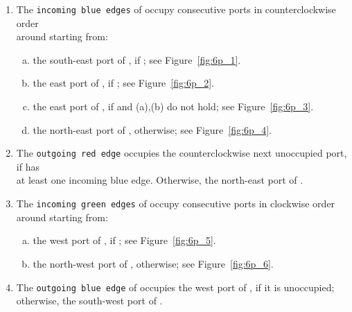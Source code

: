 \documentclass[a4paper,twoside,11pt]{article}
\begin{document}
\begin{algorithm}[t!]
\DontPrintSemicolon
{}

\BlankLine
\begin{enumerate}[{R}1:] 
\item \label{c1} The \texttt{incoming blue edges} of  occupy
consecutive ports in counterclockwise order\\around  starting
from:

\begin{enumerate}[a.]
\item \label{c1a} the south-east port of , if ; 
see Figure~\ref{fig:6p_1}.
\item \label{c1b} the east port of , if ; see Figure~\ref{fig:6p_2}.
\item \label{c1c} the east port of , if  and
(a),(b) do not hold; see Figure~\ref{fig:6p_3}. 
\item \label{c1d} the north-east port of , otherwise;
see Figure~\ref{fig:6p_4}.
\end{enumerate} 

\medskip

\item \label{c2} The \texttt{outgoing red edge} occupies the
counterclockwise next unoccupied port, if  has\\at least
one incoming blue edge. Otherwise, the north-east port of .

\medskip

\item The \label{c3} \texttt{incoming green edges} of  occupy
consecutive ports in clockwise order around  starting from:

\begin{enumerate}[a.]
\item \label{c3a} the west port of , if ; 
see Figure~\ref{fig:6p_5}.
\item \label{c3b} the north-west port of , otherwise; 
see Figure~\ref{fig:6p_6}.
\end{enumerate} 

\medskip

\item \label{c4} The \texttt{outgoing blue edge} of  occupies the
west port of , if it is unoccupied;\\otherwise, the south-west
port of .


\end{enumerate}
\end{algorithm}
\end{document}
